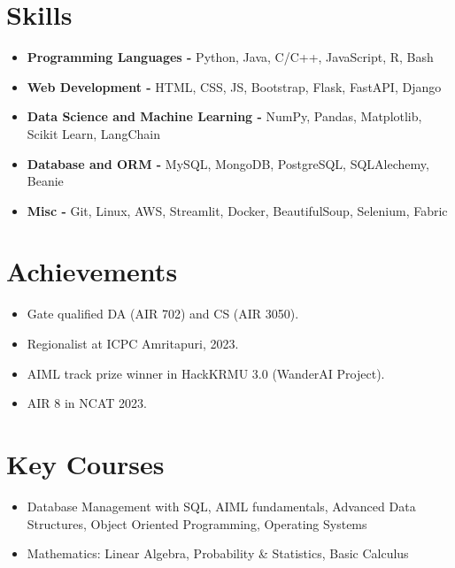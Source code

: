 \documentclass[a4paper,11pt]{article}
\begin{document}
\section*{Skills}
\vspace{-2mm}
\begin{itemize}
    \item \textbf{Programming Languages -} \small Python, Java, C/C++, JavaScript, R, Bash
    \vspace{-2mm}
    \item \textbf{Web Development -} \small HTML, CSS, JS, Bootstrap, Flask, FastAPI, Django
    \vspace{-2mm}
    \item \textbf{Data Science and Machine Learning -} \small NumPy, Pandas, Matplotlib, Scikit Learn, LangChain
    \vspace{-2mm}
    \item \textbf{Database and ORM -} \small MySQL, MongoDB, PostgreSQL, SQLAlechemy, Beanie
    \vspace{-2mm}
    \item \textbf{Misc -} \small Git, Linux, AWS, Streamlit, Docker, BeautifulSoup, Selenium, Fabric
    \vspace{-2mm}
\end{itemize}
\vspace{-5mm}

\section*{Achievements}
\vspace{-2mm}
\begin{itemize}[label=\textbullet, left=0pt, itemsep=0pt,parsep=0pt,topsep=0pt,partopsep=0pt]
    \item Gate qualified DA (AIR 702) and CS (AIR 3050).
    \item Regionalist at ICPC Amritapuri, 2023.
    \item AIML track prize winner in HackKRMU 3.0 (WanderAI Project).
    \item AIR 8 in NCAT 2023.
\end{itemize}
\vspace{-5mm}

\section*{Key Courses}
\vspace{-2mm}
\begin{itemize}[label=\textbullet, left=0pt, itemsep=0pt,parsep=0pt,topsep=0pt,partopsep=0pt]
    \item Database Management with SQL, AIML fundamentals, Advanced Data Structures, Object Oriented Programming, Operating Systems
    \item Mathematics: Linear Algebra, Probability \& Statistics, Basic Calculus
\end{itemize}
\vspace{-3mm}
\end{document}
